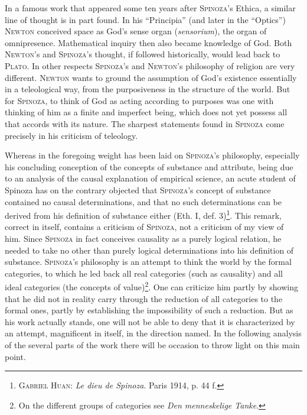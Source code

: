 \documentclass[12pt]{article}
\begin{document}
In a famous work that appeared some ten years after \textsc{Spinoza}'s Ethica, a
similar line of thought is in part found. In his ``Principia'' (and later in the
``Optics'') \textsc{Newton} conceived space as God's sense organ
(\textit{sensorium}), the organ of omnipresence. Mathematical inquiry then also
became knowledge of God. Both \textsc{Newton}'s and \textsc{Spinoza}'s thought, if
followed historically, would lead back to \textsc{Plato}. In other respects
\textsc{Spinoza}'s and \textsc{Newton}'s philosophy of religion are very different.
\textsc{Newton} wants to ground the assumption of God's existence essentially in a
teleological way, from the purposiveness in the structure of the world. But for
\textsc{Spinoza}, to think of God as acting according to purposes was one with
thinking of him as a finite and imperfect being, which does not yet possess all
that accords with its nature. The sharpest statements found in \textsc{Spinoza}
come precisely in his criticism of teleology.

Whereas in the foregoing weight has been laid on \textsc{Spinoza}'s philosophy,
especially his concluding conception of the concepts of substance and attribute,
being due to an analysis of the causal explanation of empirical science, an acute
student of Spinoza has on the contrary objected that \textsc{Spinoza}'s concept of
substance contained no causal determinations, and that no such determinations can
be derived from his definition of substance either (Eth. I, def.
3)\footnote{\textsc{Gabriel Huan}: \textit{Le dieu de Spinoza}. Paris 1914, p. 44
f.}. This remark, correct in itself, contains a criticism of \textsc{Spinoza}, not
a criticism of my view of him. Since \textsc{Spinoza} in fact conceives causality
as a purely logical relation, he needed to take no other than purely logical
determinations into his definition of substance. \textsc{Spinoza}'s philosophy is an
attempt to think the world by the formal categories, to which he led back all real
categories (such as causality) and all ideal categories (the concepts of
value)\footnote{On the different groups of categories see \textit{Den menneskelige
Tanke}.}. One can criticize him partly by showing that he did not in reality carry
through the reduction of all categories to the formal ones, partly by establishing
the impossibility of such a reduction. But as his work actually stands, one will
not be able to deny that it is characterized by an attempt, magnificent in itself,
in the direction named. In the following analysis of the several parts of the work
there will be occasion to throw light on this main point.
\end{document}

